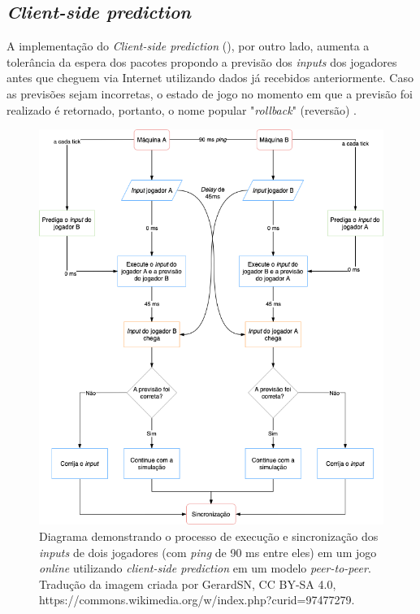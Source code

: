 \subsection{\textit{Client-side prediction}}

A implementação do \textit{Client-side prediction} (), por outro lado, aumenta a tolerância da espera dos pacotes propondo a previsão dos \textit{inputs} dos jogadores antes que cheguem via Internet utilizando dados já recebidos anteriormente. Caso as previsões sejam incorretas, o estado de jogo no momento em que a previsão foi realizado é retornado, portanto, o nome popular "\textit{rollback}" (reversão) \cite{rollback}.

\begin{figure}[htbp]
\centering
\includegraphics[width=1\textwidth]{images/rollback.png}
\caption{Diagrama demonstrando o processo de execução e sincronização dos \textit{inputs} de dois jogadores (com \textit{ping} de 90 ms entre eles) em um jogo \textit{online} utilizando \textit{client-side prediction} em um modelo \textit{peer-to-peer}. Tradução da imagem criada por GerardSN, CC BY-SA 4.0, https://commons.wikimedia.org/w/index.php?curid=97477279.}
\label{fig:rollback_diagram}
\end{figure}

